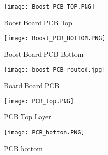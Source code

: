 \begin{figure}[h]
\centering
\texttt{[image: Boost\_PCB\_TOP.PNG]}
\caption{Boost Board PCB Top}
\label{Figure 7}
\end{figure}

\begin{figure}[h]
\centering
\texttt{[image: Boost\_PCB\_BOTTOM.PNG]}
\caption{Boost Board PCB Bottom}
\label{Figure 8}
\end{figure}

\begin{figure}[h]
\centering
\texttt{[image: boost\_PCB\_routed.jpg]}
\caption{Board Board PCB}
\label{Figure D}
\end{figure}

\begin{figure}[h]
\centering
\texttt{[image: PCB\_top.PNG]}
\caption{PCB Top Layer}
\label{PCB top}
\end{figure}

\begin{figure}[h]
\centering
\texttt{[image: PCB\_bottom.PNG]}
\caption{PCB bottom}
\label{PCB bottom}
\end{figure}